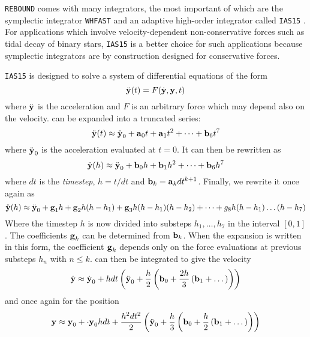 \texttt{REBOUND} comes with many integrators, the most important of which
are the symplectic integrator \texttt{WHFAST} \citep{Rein2015} and an
adaptive high-order integrator called \texttt{IAS15} \citep{Rein2014}. For
applications which involve velocity-dependent non-conservative forces
such as tidal decay of binary stars, \texttt{IAS15} is a better choice
for such applications because symplectic integrators are by construction
designed for conservative forces. 

\texttt{IAS15} is designed to solve a system of differential equations of the form
\begin{equation}
    \ddot{\boldsymbol{\mathbf{y}}}(t)=F(\dot{\boldsymbol{\mathbf{y}}},\boldsymbol{\mathbf{y}},t)
    \label{eq:diff_eq}
\end{equation}
where $\ddot{\boldsymbol{\mathbf{y}}}$ is the acceleration and $F$ is an arbitrary force
which may depend also on the velocity.  can be expanded
into a truncated series:
\begin{equation}
    \ddot{\boldsymbol{\mathbf{y}}}(t)\approx \ddot{\boldsymbol{\mathbf{y}}}_0 + \boldsymbol{\mathbf{a}}_0t+\boldsymbol{\mathbf{a}}_1t^2
    +\dots+\boldsymbol{\mathbf{b}}_6t^7
\end{equation}
where $\ddot{\boldsymbol{\mathbf{y}}}_0$ is the acceleration evaluated at $t=0$. 
It can then be rewritten as
\begin{equation}
    \ddot{\boldsymbol{\mathbf{y}}}(h)\approx \ddot{\boldsymbol{\mathbf{y}}}_0 + \boldsymbol{\mathbf{b}}_0h+\boldsymbol{\mathbf{b}}_1h^2
    +\dots+\boldsymbol{\mathbf{b}}_6h^7
    \label{eq:diff_eq2}
\end{equation}
where $dt$ is the \emph{timestep}, $h=t/dt$ and $\boldsymbol{\mathbf{b}}_k=\boldsymbol{\mathbf{a}}_kdt^{k+1}$.
Finally, we rewrite it once again as
\begin{equation}
    \ddot{\boldsymbol{\mathbf{y}}}(h)\approx \ddot{\boldsymbol{\mathbf{y}}}_0 + \boldsymbol{\mathbf{g}}_1h+\boldsymbol{\mathbf{g}}_2h
    (h-h_1)+\boldsymbol{\mathbf{g}}_3h(h-h_1)(h-h_2)+\dots+g_8h(h-h_1)\dots(h-h_7)
\end{equation}
Where the timestep $h$ is now divided into substeps $h_1,\dots,h_7$ in the
interval $[0,1]$. The coefficients $\boldsymbol{\mathbf{g}}_k$ can be determined from 
$\boldsymbol{\mathbf{b}}_k$. When the expansion is written in this form, the coefficient 
$\boldsymbol{\mathbf{g}}_k$ depends only on the force evaluations at previous substeps
$h_n$ with $n\leq k$.  can then be integrated to give the velocity
\begin{equation}
    \dot{\boldsymbol{\mathbf{y}}}\approx \dot{\boldsymbol{\mathbf{y}}}_0+hdt\left(\ddot{\boldsymbol{\mathbf{y}}}_0+
    \frac{h}{2} \left(\boldsymbol{\mathbf{b}}_0+ \frac{2h}{3} \left(\boldsymbol{\mathbf{b}}_1+\dots\right)
    \right)\right)
\end{equation}
and once again for the position
\begin{equation}
    \boldsymbol{\mathbf{y}}\approx\boldsymbol{\mathbf{y}}_0+\cdot{\boldsymbol{\mathbf{y}}}_0hdt+ \frac{h^2dt^2}{2} 
    \left(\ddot{\boldsymbol{\mathbf{y}}}_0+
    \frac{h}{3} \left(\boldsymbol{\mathbf{b}}_0+ \frac{h}{2} \left(\boldsymbol{\mathbf{b}}_1+\dots\right)
    \right)\right)
\end{equation}
